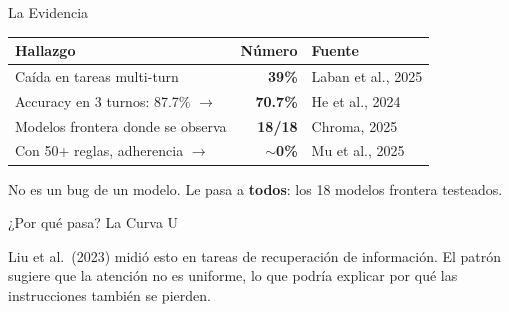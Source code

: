 \documentclass[aspectratio=169, 12pt]{beamer}
\begin{document}
\begin{frame}{La Evidencia}

\begin{center}
\renewcommand{\arraystretch}{1.5}
\begin{tabular}{@{} p{7.5cm} r l @{}}
\toprule
\textbf{Hallazgo} & \textbf{N\'umero} & \textbf{Fuente} \\
\midrule
Ca\'ida en tareas multi-turn & \alert{\textbf{39\%}} & Laban et al., 2025 \\
Accuracy en 3 turnos: 87.7\% $\to$ & \alert{\textbf{70.7\%}} & He et al., 2024 \\
Modelos frontera donde se observa & \alert{\textbf{18/18}} & Chroma, 2025 \\
Con 50+ reglas, adherencia $\to$ & \alert{\textbf{$\sim$0\%}} & Mu et al., 2025 \\
\bottomrule
\end{tabular}
\end{center}

\vspace{1em}

\begin{center}
\footnotesize
No es un bug de un modelo. Le pasa a \textbf{todos}: los 18 modelos frontera testeados.
\end{center}

\end{frame}

\begin{frame}{¿Por qu\'e pasa? La Curva U}

\begin{center}
\end{center}

\vspace{0.3em}

Liu et al.\ (2023) midi\'o esto en tareas de recuperaci\'on de informaci\'on. El patr\'on sugiere que la atenci\'on no es uniforme, lo que podr\'ia explicar por qu\'e las instrucciones tambi\'en se pierden.

\end{frame}
\end{document}
